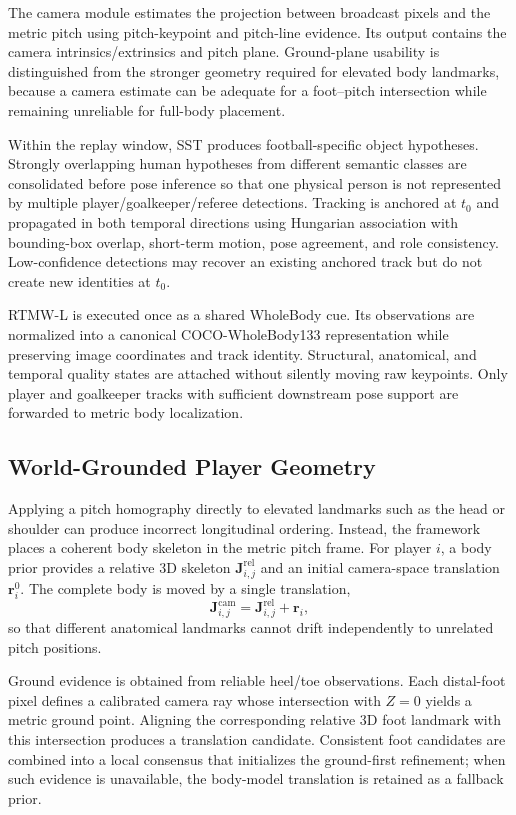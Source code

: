 \documentclass[runningheads]{llncs}
\begin{document}
The camera module estimates the projection between broadcast pixels and the metric pitch using pitch-keypoint and pitch-line evidence. Its output contains the camera intrinsics/extrinsics and pitch plane. Ground-plane usability is distinguished from the stronger geometry required for elevated body landmarks, because a camera estimate can be adequate for a foot--pitch intersection while remaining unreliable for full-body placement.

Within the replay window, SST produces football-specific object hypotheses. Strongly overlapping human hypotheses from different semantic classes are consolidated before pose inference so that one physical person is not represented by multiple player/goalkeeper/referee detections. Tracking is anchored at $t_0$ and propagated in both temporal directions using Hungarian association with bounding-box overlap, short-term motion, pose agreement, and role consistency. Low-confidence detections may recover an existing anchored track but do not create new identities at $t_0$.

RTMW-L is executed once as a shared WholeBody cue. Its observations are normalized into a canonical COCO-WholeBody133 representation while preserving image coordinates and track identity. Structural, anatomical, and temporal quality states are attached without silently moving raw keypoints. Only player and goalkeeper tracks with sufficient downstream pose support are forwarded to metric body localization.

\subsection{World-Grounded Player Geometry}
\label{subsec:world_body}

Applying a pitch homography directly to elevated landmarks such as the head or shoulder can produce incorrect longitudinal ordering. Instead, the framework places a coherent body skeleton in the metric pitch frame. For player $i$, a body prior provides a relative 3D skeleton $\mathbf{J}^{\mathrm{rel}}_{i,j}$ and an initial camera-space translation $\mathbf r_i^0$. The complete body is moved by a single translation,
\begin{equation}
\mathbf{J}^{\mathrm{cam}}_{i,j}
=
\mathbf{J}^{\mathrm{rel}}_{i,j}+\mathbf r_i,
\label{eq:coherent_body}
\end{equation}
so that different anatomical landmarks cannot drift independently to unrelated pitch positions.

Ground evidence is obtained from reliable heel/toe observations. Each distal-foot pixel defines a calibrated camera ray whose intersection with $Z=0$ yields a metric ground point. Aligning the corresponding relative 3D foot landmark with this intersection produces a translation candidate. Consistent foot candidates are combined into a local consensus that initializes the ground-first refinement; when such evidence is unavailable, the body-model translation is retained as a fallback prior.
\end{document}
